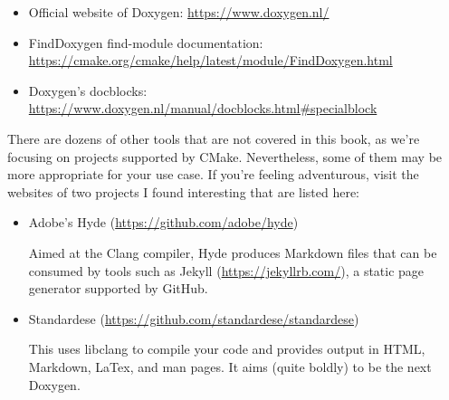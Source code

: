

\begin{itemize}
\item 
Official website of Doxygen: \url{https://www.doxygen.nl/}

\item 
FindDoxygen find-module documentation: \url{https://cmake.org/cmake/help/latest/module/FindDoxygen.html}

\item 
Doxygen's docblocks: \url{https://www.doxygen.nl/manual/docblocks.html\#specialblock}
\end{itemize}



There are dozens of other tools that are not covered in this book, as we're focusing on projects supported by CMake. Nevertheless, some of them may be more appropriate for your use case. If you're feeling adventurous, visit the websites of two projects I found interesting that are listed here:

\begin{itemize}
\item 
Adobe's Hyde (\url{https://github.com/adobe/hyde})

Aimed at the Clang compiler, Hyde produces Markdown files that can be consumed by tools such as Jekyll (\url{https://jekyllrb.com/}), a static page generator supported by GitHub.

\item 
Standardese (\url{https://github.com/standardese/standardese})

This uses libclang to compile your code and provides output in HTML, Markdown, LaTex, and man pages. It aims (quite boldly) to be the next Doxygen.
\end{itemize}



















